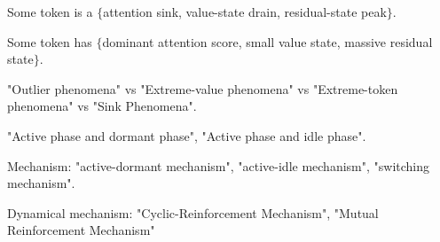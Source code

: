     
    

Some token is a $\{$attention sink, value-state drain, residual-state peak$\}$. 

Some token has $\{$dominant attention score, small value state, massive residual state$\}$. 

"Outlier phenomena" vs "Extreme-value phenomena" vs "Extreme-token phenomena" vs "Sink Phenomena". 

"Active phase and dormant phase", "Active phase and idle phase". 

Mechanism: "active-dormant mechanism", "active-idle mechanism", "switching mechanism". 

Dynamical mechanism: "Cyclic-Reinforcement Mechanism", "Mutual Reinforcement Mechanism"


